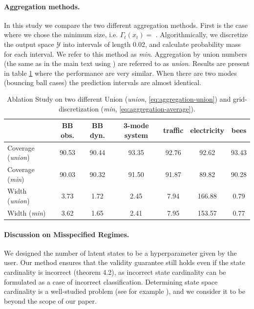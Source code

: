 \paragraph{Aggregation methods.} In this study we compare the two different aggregation methods. First is the case where we chose the minimum size, i.e. $\Gamma_t(x_t) = $ . Algorithmically, we discretize the output space $\mathcal{Y}$ into intervals of length 0.02, and calculate probability mass for each interval. We refer to this method as \emph{min}. Aggregation by union numbers (the same as in the main text using ) are referred to as \emph{union}. Results are present in table \ref{tab:aggregation} where the performance are very similar. When there are two modes (bouncing ball cases) the prediction intervals are almost identical.
 
\begin{table}[h!]
\centering
\caption{Ablation Study on two different Union (\textit{union}, \eqref{eq:aggregation-union}) and grid-discretization (\textit{min}, \eqref{eq:aggregation-average}).}
\vspace{0.5em}
\label{tab:aggregation}
\begin{tabular}{lcccccc}
\toprule
& BB obs. & BB dyn. & 3-mode system & traffic & electricity & bees \\
\midrule
\midrule
Coverage (\textit{union}) & 90.53 & 90.44 & 93.35 & 92.76 & 92.62 & 93.43 \\
Coverage (\emph{min})  & 90.03 & 90.32 & 91.50 & 91.87 & 89.82 & 90.28 \\
Width (\textit{union})   & 3.73  & 1.72  & 2.45 & 7.94  & 166.88 & 0.79 \\
Width (\emph{min})     & 3.62 & 1.65  & 2.41 & 7.95  & 153.57 & 0.77 \\
\bottomrule
\end{tabular}
\end{table}

\paragraph{Discussion on Misspecified Regimes.} We designed the number of latent states to be a hyperparameter given by the user. Our method ensures that the validity guarantee still holds even if the state cardinality is incorrect (theorem 4.2), as incorrect state cardinality can be formulated as a case of incorrect classification. Determining state space cardinality is a well-studied problem (see for example \cite{branicky1994stability}), and we consider it to be beyond the scope of our paper.


